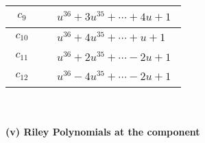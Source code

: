 \documentclass[1p]{elsarticle_modified}
\theoremstyle{definition}
\begin{document}
\begin{tabular}{m{50pt}|m{274pt}}
\hline $$\begin{aligned}c_{9}\end{aligned}$$&$\begin{aligned}
&u^{36}+3 u^{35}+\cdots+4 u+1
\end{aligned}$\\
\hline $$\begin{aligned}c_{10}\end{aligned}$$&$\begin{aligned}
&u^{36}+4 u^{35}+\cdots+u+1
\end{aligned}$\\
\hline $$\begin{aligned}c_{11}\end{aligned}$$&$\begin{aligned}
&u^{36}+2 u^{35}+\cdots-2 u+1
\end{aligned}$\\
\hline $$\begin{aligned}c_{12}\end{aligned}$$&$\begin{aligned}
&u^{36}-4 u^{35}+\cdots-2 u+1
\end{aligned}$\\
\hline
\end{tabular}\\~\\
\newpage\renewcommand{\arraystretch}{1}
\flushleft \textbf{(v) Riley Polynomials at the component}\newline \\
\end{document}
